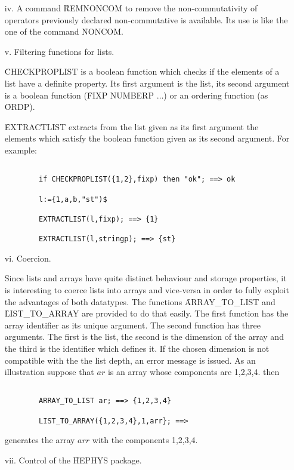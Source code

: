 \begin{itemize}
\item[iv.] A command \f{REMNONCOM} to remove the non-commutativity of 
operators previously declared non-commutative is available. Its use is like 
the one of the command \f{NONCOM}.

\item[v.] Filtering functions for lists.

\f{CHECKPROPLIST}  is a  boolean function which checks if the
elements of a list have a definite property. Its first argument
is the list, its second argument is a boolean function
(\f{FIXP NUMBERP $\ldots$}) or an ordering function (as \f{ORDP}).

\f{EXTRACTLIST} extracts from the list given as its first argument
the elements which satisfy the boolean function given as its second
argument. For example:
\begin{verbatim}

        if CHECKPROPLIST({1,2},fixp) then "ok"; ==> ok

        l:={1,a,b,"st")$

        EXTRACTLIST(l,fixp); ==> {1}

        EXTRACTLIST(l,stringp); ==> {st}

\end{verbatim}
\item[vi.] Coercion.

Since lists and arrays have quite distinct behaviour and storage properties,  
it is interesting to coerce lists into arrays and vice-versa in order to 
fully exploit the advantages of both datatypes. The functions  
\f{ARRAY\_TO\_LIST} and \f{LIST\_TO\_ARRAY} are provided to do that easily.
The first function has the array identifier as its unique argument. 
The second
function has three arguments. The first is the list, the second is the 
dimension of the array and the third is the identifier which defines it.  
If the chosen dimension is not compatible with the
the list depth, an error message is issued.  
As an illustration suppose that $ar$ is an array whose components are  
1,2,3,4. then
\begin{verbatim}

        ARRAY_TO_LIST ar; ==> {1,2,3,4}

        LIST_TO_ARRAY({1,2,3,4},1,arr}; ==> 

\end{verbatim}
generates the array $arr$ with the components 1,2,3,4.
\item[vii.] Control of the \f{HEPHYS} package.  


\end{itemize}
